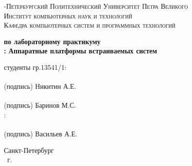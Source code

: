 \documentclass[14pt,a4paper,report]{report}
\begin{document}
\def\contentsname{Содержание}

\begin{titlepage}
	\begin{center}
		\textsc{-Петербургский Политехнический Университет Петра Великого\\[5mm]
Институт компьютерных наук и технологий\\[5mm]
Кафедра компьютерных систем и программных технологий\\[5mm]}
		
		\vfill
		
		\textbf{ по лабораторному практикуму\\[3mm]
			: Аппаратные платформы встраиваемых систем\\[15mm]
		}
	\end{center}
	
	\vfill
\begin{flushright}
	\begin{minipage}{.4\textwidth}
		{ студенты гр.13541/1:\\[2mm] 
		\underline{\hspace{2in}}\\ %
  		\centering
  		\small(подпись)
		Никитин А.Е.\\[5mm]

		\underline{\hspace{2in}}\\ %
  		\centering
 		 \small(подпись)
		Баринов М.С.\\[5mm]
		:\\[2mm] 
		\underline{\hspace{2in}}\\ %
  		\centering
 		 \small(подпись)
		Васильев А.Е.\\
		}
	\end{minipage}
\end{flushright}
	\vfill
	\begin{center}
		Санкт-Петербург\\ \the\year\ г.
	\end{center}
\end{titlepage}

\tableofcontents
\clearpage
\end{document}
